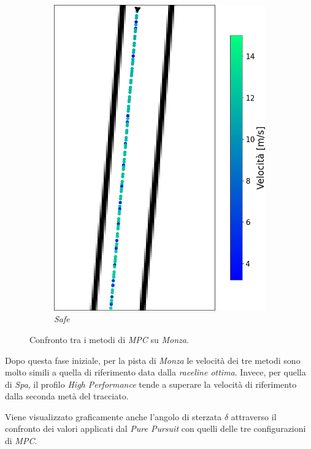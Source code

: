 \begin{figure}[H]
\begin{subfigure}[b]{0.3805\textwidth}
        \includegraphics[width=\textwidth]{images/monza_zoom_mpc_safe_speed.png}
        \caption{\textit{Safe}}
        \label{fig:safe_speed}
    \end{subfigure}
    \caption{Confronto tra i metodi di \textit{MPC} su \textit{Monza}.}
    \label{fig:fig21} %
\end{figure}

Dopo questa fase iniziale, per la pista di \textit{Monza} le velocità 
dei tre metodi sono molto simili a quella di riferimento data dalla 
\textit{raceline ottima}. Invece, per quella di \textit{Spa}, il profilo
\textit{High Performance} tende a superare la velocità di riferimento dalla seconda metà del tracciato.

Viene visualizzato graficamente anche l'angolo di sterzata $\delta$ attraverso il confronto dei
valori applicati dal \textit{Pure Pursuit} con quelli delle tre configurazioni di \textit{MPC}.


